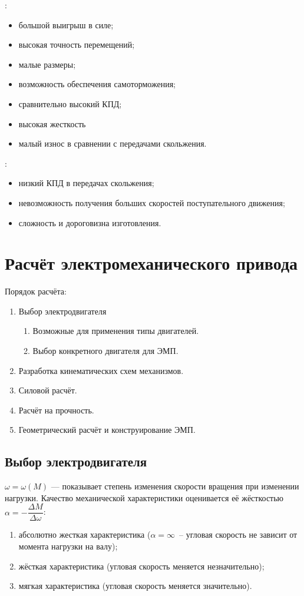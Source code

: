 \documentclass{tufte-book}
\begin{document}
:
\begin{itemize}
	\item большой выигрыш в силе;
	\item высокая точность перемещений;
	\item малые размеры;
	\item возможность обеспечения самоторможения;
	\item сравнительно высокий КПД;
	\item высокая жесткость
	\item малый износ в сравнении с передачами скольжения.
\end{itemize}

:
\begin{itemize}
	\item низкий КПД в передачах скольжения;
	\item невозможность получения больших скоростей поступательного движения;
	\item сложность и дороговизна изготовления.
\end{itemize}

\chapter{Расчёт электромеханического привода}
\label{ch:EMP}

Порядок расчёта:
\begin{enumerate}
	\item Выбор электродвигателя
	\begin{enumerate}
		\item Возможные для применения типы двигателей.
		\item Выбор конкретного двигателя для ЭМП.
	\end{enumerate}
	\item Разработка кинематических схем механизмов.
	\item Силовой расчёт.
	\item Расчёт на прочность.
	\item Геометрический расчёт и конструирование ЭМП.
\end{enumerate}

\section{Выбор электродвигателя}

 $ \omega = \omega (M) $ --- показывает степень изменения скорости вращения при изменении нагрузки.
Качество механической характеристики оценивается её жёсткостью $ \alpha = - \dfrac{\Delta M}{\Delta \omega} $:
\begin{enumerate}
	\item абсолютно жесткая характеристика ($ \alpha = \infty $~-- угловая скорость не зависит от момента нагрузки на валу);
	\item жёсткая характеристика (угловая скорость меняется незначительно);
	\item мягкая характеристика (угловая скорость меняется значительно).
\end{enumerate}
\end{document}
